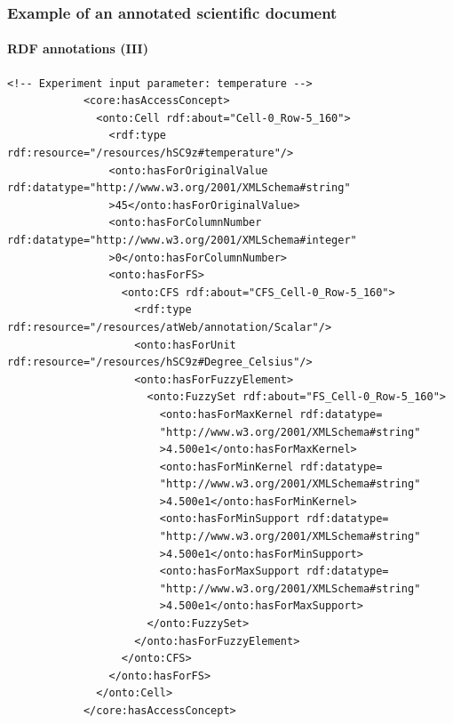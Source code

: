 \documentclass{beamer}
\begin{document}
\begin{frame}[fragile]
  \frametitle{Example of an annotated scientific document}
  \framesubtitle{RDF annotations (III)}

  \begin{Verbatim}[fontsize=\tiny]
            <!-- Experiment input parameter: temperature -->
            <core:hasAccessConcept>
              <onto:Cell rdf:about="Cell-0_Row-5_160">
                <rdf:type rdf:resource="/resources/hSC9z#temperature"/>
                <onto:hasForOriginalValue rdf:datatype="http://www.w3.org/2001/XMLSchema#string"
                >45</onto:hasForOriginalValue>
                <onto:hasForColumnNumber rdf:datatype="http://www.w3.org/2001/XMLSchema#integer"
                >0</onto:hasForColumnNumber>
                <onto:hasForFS>
                  <onto:CFS rdf:about="CFS_Cell-0_Row-5_160">
                    <rdf:type rdf:resource="/resources/atWeb/annotation/Scalar"/>
                    <onto:hasForUnit rdf:resource="/resources/hSC9z#Degree_Celsius"/>
                    <onto:hasForFuzzyElement>
                      <onto:FuzzySet rdf:about="FS_Cell-0_Row-5_160">
                        <onto:hasForMaxKernel rdf:datatype=
                        "http://www.w3.org/2001/XMLSchema#string"
                        >4.500e1</onto:hasForMaxKernel>
                        <onto:hasForMinKernel rdf:datatype=
                        "http://www.w3.org/2001/XMLSchema#string"
                        >4.500e1</onto:hasForMinKernel>
                        <onto:hasForMinSupport rdf:datatype=
                        "http://www.w3.org/2001/XMLSchema#string"
                        >4.500e1</onto:hasForMinSupport>
                        <onto:hasForMaxSupport rdf:datatype=
                        "http://www.w3.org/2001/XMLSchema#string"
                        >4.500e1</onto:hasForMaxSupport>
                      </onto:FuzzySet>
                    </onto:hasForFuzzyElement>
                  </onto:CFS>
                </onto:hasForFS>
              </onto:Cell>
            </core:hasAccessConcept>
  \end{Verbatim}
\end{frame}
\end{document}
